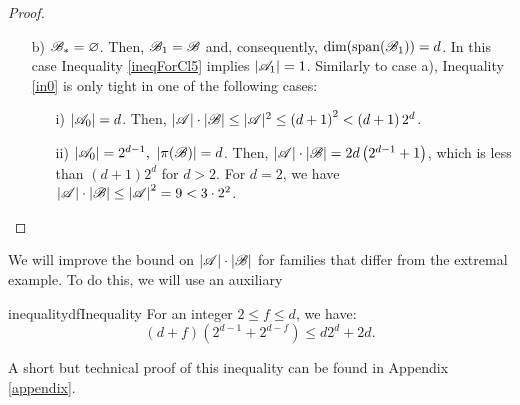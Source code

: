 \begin{proof}
\begin{enumerate}
\begin{enumerate}
\begin{enumerate}
            \end{enumerate}
            \item [b)] ${\mathscr{B}}_*=\varnothing$. Then, ${\mathscr{B}}_1 = {\mathscr{B}}$ and, consequently, $\operatorname{dim}(\operatorname{span}({\mathscr{B}}_1))=d$. In this case Inequality \ref{ineqForCl5} implies $|{\mathscr{A}}_1|=1$.
            Similarly to case a), Inequality \ref{in0} is only tight in one of the following cases:
            \begin{enumerate}
                \item[i)]$\left|{\mathscr{A}}_0\right|=d$. Then, $|{\mathscr{A}}|\cdot|{\mathscr{B}}| \leq |{\mathscr{A}}|^2 \leq \left(d+1\right)^2<\left(d+1\right)2^d$.
                \item[ii)]$\left|{\mathscr{A}}_0\right|=2^{d-1}\text{, }\left|\pi({\mathscr{B}})\right|=d$. Then, $\left|{\mathscr{A}}\right|\cdot\left|{\mathscr{B}}\right|=2d\left(2^{d-1}+1\right)$, which is less than $(d+1)2^d$ for $d>2$. For $d=2$, we have $\left|{\mathscr{A}}\right|\cdot\left|{\mathscr{B}}\right|\leq\left|{\mathscr{A}}\right|^2=9<3\cdot2^2$.
            \end{enumerate}
        \end{enumerate}
    \end{enumerate}
\end{proof}

\noindent We will improve the bound on $\left|{\mathscr{A}}\right|\cdot\left|{\mathscr{B}}\right|$ for families that differ from the extremal example. To do this, we will use an auxiliary 

\begin{restatable}{inequality}{dfInequality}\label{in2}
    For an integer $2\leq f\leq d$, we have: \[(d+f)(2^{d-1}+2^{d-f})\leq d2^d + 2d.\]
\end{restatable}

\noindent 
A short but technical proof of this inequality can be found in Appendix \ref{appendix}.

